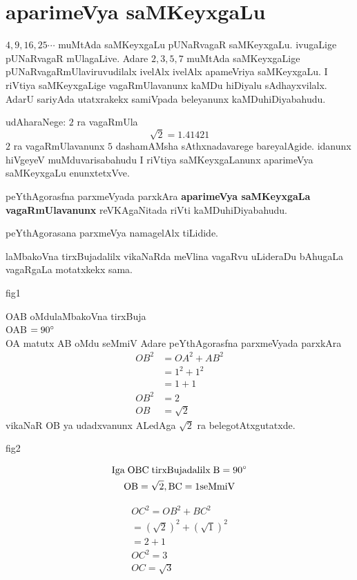 \chapter{aparimeVya saMKeyxgaLu}

$ 4,9,16,25\cdots$ muMtAda saMKeyxgaLu pUNaRvagaR saMKeyxgaLu. ivugaLige pUNaRvagaR mUlagaLive. Adare 
$2,3,5,7$ muMtAda saMKeyxgaLige pUNaRvagaRmUlaviruvudilalx ivelAlx ivelAlx apameVriya saMKeyxgaLu. I 
riVtiya saMKeyxgaLige vagaRmUlavanunx kaMDu hiDiyalu sAdhayxvilalx. AdarU sariyAda utatxrakekx 
samiVpada beleyanunx kaMDuhiDiyabahudu.

udAharaNege: \qquad $2$ ra vagaRmUla
$$
\sqrt{2} = 1.41421
$$
$2$ ra vagaRmUlavanunx $5$ dashamAMsha sAthxnadavarege bareyalAgide. idanunx hiVgeyeV muMduvarisabahudu I riVtiya saMKeyxgaLanunx aparimeVya saMKeyxgaLu enunxtetxVve.

peYthAgorasfna parxmeVyada parxkAra {\bf aparimeVya saMKeyxgaLa vagaRmUlavanunx} \-reVKAgaNitada riVti kaMDuhiDiyabahudu.

peYthAgorasana parxmeVya namagelAlx tiLidide. 

laMbakoVna tirxBujadalilx vikaNaRda meVlina vagaRvu uLideraDu bAhugaLa vagaRgaLa motatxkekx sama.

\begin{center}
{\rm fig1}
\end{center}
{\rm OAB} {\text oMdulaMbakoVna tirxBuja}\\
{\rm OAB} $= 90\degree$\\
{\rm OA} matutx {\rm AB} oMdu seMmiV Adare peYthAgorasfna parxmeVyada parxkAra
\begin{align*}
OB^2 &= OA^2+AB^2\\
&= 1^2+1^2\\
&= 1+1\\
OB^2 &= 2\\
OB &= \sqrt{2}
\end{align*}
vikaNaR {\rm OB} ya udadxvanunx ALedAga $\sqrt{2}$ ra belegotAtxgutatxde.
\begin{center}
{\rm fig2}
\end{center}

\begin{gather*}
\text{Iga}\; {\rm OBC} \;\text{tirxBujadalilx}\; {\rm B} = 90\degree\\
{\rm OB}=\sqrt{2}, {\rm BC} = 1 \text{seMmiV}
\end{gather*}

\begin{align*}
OC^2 = OB^2+BC^2\\
= (\sqrt{2})^2+(\sqrt{1})^2\\
=2+1\\
OC^2= 3\\
OC = \sqrt{3}
\end{align*}

